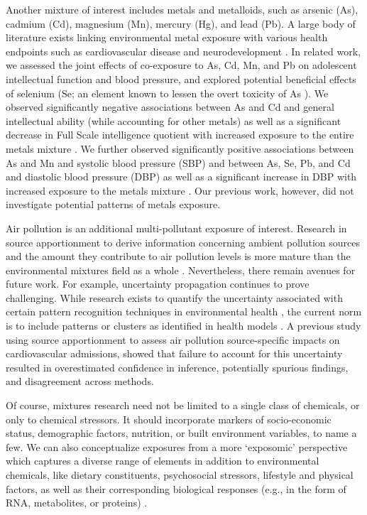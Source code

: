 Another mixture of interest includes metals and metalloids, such as arsenic (As), cadmium (Cd), magnesium (Mn), mercury (Hg), and lead (Pb). A large body of literature exists linking environmental metal exposure with various health endpoints such as cardiovascular disease \citep{nigra2016environmental} and neurodevelopment \citep{henn2012associations}. In related work, we assessed the joint effects of co-exposure to As, Cd, Mn, and Pb on adolescent intellectual function and blood pressure, and explored potential beneficial effects of selenium (Se; an element known to lessen the overt toxicity of As \citep{levander1977metabolic}). We observed significantly negative associations between As and Cd and general intellectual ability (while accounting for other metals) as well as a significant decrease in Full Scale intelligence quotient with increased exposure to the entire metals mixture \citep{wasserman2018cross}. We further observed significantly positive associations between As and Mn and systolic blood pressure (SBP) and between As, Se, Pb, and Cd and diastolic blood pressure (DBP) as well as a significant increase in DBP with increased exposure to the metals mixture \citep{chen2019early}. Our previous work, however, did not investigate potential patterns of metals exposure.

Air pollution is an additional multi-pollutant exposure of interest. Research in source apportionment to derive information concerning ambient pollution sources and the amount they contribute to air pollution levels is more mature than the environmental mixtures field as a whole \citep{paatero94, sun2020positive, krall2017associations}. Nevertheless, there remain avenues for future work. For example, uncertainty propagation continues to prove challenging. While research exists to quantify the uncertainty associated with certain pattern recognition techniques in environmental health \citep{park2015part, gass2015ensemble}, the current norm is to include patterns or clusters as identified in health models \citep{austin2012framework, zanobetti2014health, sarnat2008fine, krall2017associations, basagana2016neurodevelopmental, siponen2015source, dai2016fine}. A previous study using source apportionment to assess air pollution source-specific impacts on cardiovascular admissions, \citet{mak14_unc} showed that failure to account for this uncertainty resulted in overestimated confidence in inference, potentially spurious findings, and disagreement across methods.

Of course, mixtures research need not be limited to a single class of chemicals, or only to chemical stressors. It should incorporate markers of socio-economic status, demographic factors, nutrition, or built environment variables, to name a few. We can also conceptualize exposures from a more `exposomic' perspective which captures a diverse range of elements in addition to environmental chemicals, like dietary constituents, psychosocial stressors, lifestyle and physical factors, as well as their corresponding biological responses (e.g., in the form of RNA, metabolites, or proteins) \citep{vermeulen2020exposome}.


